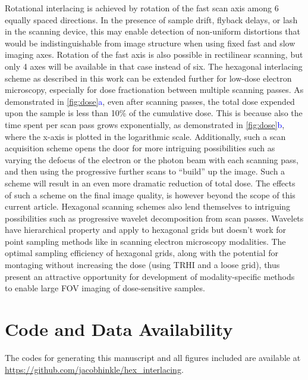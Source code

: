 \documentclass[aip, amsmath, amssymb, nobibnotes, nofootinbib, citeautoscript, reprint, superscriptaddress]{revtex4-2}
\newcommand*{\blu}{\textcolor{blue}}
\begin{document}
    Rotational interlacing is achieved by rotation of the fast scan axis among 6 equally spaced directions.
    In the presence of sample drift, flyback delays, or lash in the scanning device, this may enable detection of non-uniform distortions that would be indistinguishable from image structure when using fixed fast and slow imaging axes.
    Rotation of the fast axis is also possible in rectilinear scanning, but only 4 axes will be available in that case instead of six.
    The hexagonal interlacing scheme as described in this work can be extended further for low-dose electron microscopy, especially for dose fractionation between multiple scanning passes. 
    As demonstrated in \autoref{fig:dose}\blu{a}, even after scanning passes, the total dose expended upon the sample is less than 10\% of the cumulative dose. 
    This is because also the time spent per scan pass grows exponentially, as demonstrated in \autoref{fig:dose}\blu{b}, where the x-axis is plotted in the logarithmic scale.
    Additionally, such a scan acquisition scheme opens the door for more intriguing possibilities such as varying the defocus of the electron or the photon beam with each scanning pass, and then using the progressive further scans to ``build'' up the image. 
    Such a scheme will result in an even more dramatic reduction of total dose. 
    The effects of such a scheme on the final image quality, is however beyond the scope of this current article.
    Hexagonal scanning schemes also lend themselves to intriguing possibilities such as progressive wavelet decomposition from scan passes.
    Wavelets have hierarchical property and apply to hexagonal grids \cite{hex_compression} but doesn't work for point sampling methods like in scanning electron microscopy modalities.
    The optimal sampling efficiency of hexagonal grids, along with the potential for montaging without increasing the dose (using TRHI and a loose grid), thus present an attractive opportunity for development of modality-specific methods to enable large FOV imaging of dose-sensitive samples.

    \section{Code and Data Availability}

    The codes for generating this manuscript and all figures included are available at \url{https://github.com/jacobhinkle/hex_interlacing}. 
\end{document}
